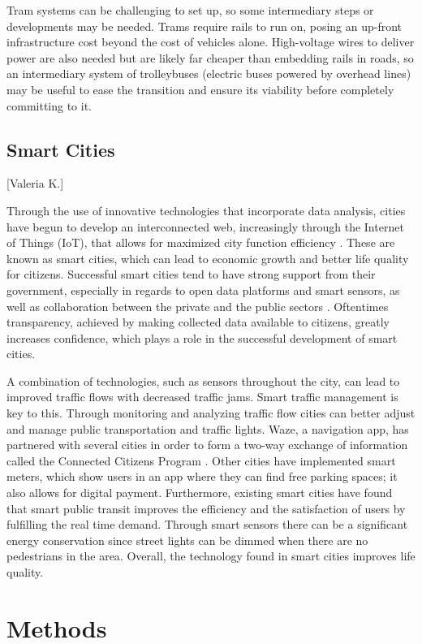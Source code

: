 \documentclass[12pt]{article}                         %
\begin{document}
Tram systems can be challenging to set up, so some intermediary steps or developments may be needed. Trams require rails to run on, posing an up-front infrastructure cost beyond the cost of vehicles alone. High-voltage wires to deliver power are also needed but are likely far cheaper than embedding rails in roads, so an intermediary system of trolleybuses (electric buses powered by overhead lines) may be useful to ease the transition and ensure its viability before completely committing to it. 

\subsection{Smart Cities}[Valeria K.]

Through the use of innovative technologies that incorporate data analysis, cities have begun to develop an interconnected web, increasingly through the Internet of Things (IoT), that allows for maximized city function efficiency \cite{MargaretRouseSmartCity}. These are known as smart cities, which can lead to economic growth and better life quality for citizens. Successful smart cities tend to have strong support from their government, especially in regards to open data platforms and smart sensors, as well as collaboration between the private and the public sectors \cite{BrianZanghi2017WhyExamples}. Oftentimes transparency, achieved by making collected data available to citizens, greatly increases confidence, which plays a role in the successful development of smart cities.

A combination of technologies, such as sensors throughout the city, can lead to improved traffic flows with decreased traffic jams. Smart traffic management is key to this. Through monitoring and analyzing traffic flow cities can better adjust and manage public transportation and traffic lights. Waze, a navigation app, has partnered with several cities in order to form a two-way exchange of information called the Connected Citizens Program \cite{Stern2016WazeMobility}. Other cities have implemented smart meters, which show users in an app where they can find free parking spaces; it also allows for digital payment. Furthermore, existing smart cities have found that smart public transit improves the efficiency and the satisfaction of users by fulfilling the real time demand. Through smart sensors there can be a significant energy conservation since street lights can be dimmed when there are no pedestrians in the area. Overall, the technology found in smart cities improves life quality. 

\newpage
\section{Methods}


\newpage


\end{document}
